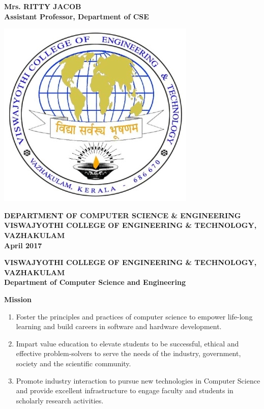 \documentclass[a4 paper,11pt]{report}
\begin{document}
\begin{titlepage}
\begin{center}
		\vspace{0.1cm}
		\large\textbf{Mrs. RITTY JACOB\\ Assistant Professor, Department of CSE}       
        
        \vspace{0.2cm}
        
        \includegraphics[width=.25\textwidth]{vjcet.jpg}
        
        \vspace{0.1cm}
        
        \normalsize \textbf {DEPARTMENT OF COMPUTER SCIENCE \& ENGINEERING}\\
        \vspace{.1cm}
        \large \textbf {VISWAJYOTHI COLLEGE OF ENGINEERING \& TECHNOLOGY, VAZHAKULAM}\\
        \normalsize \textbf{April 2017}
        
    \end{center}
\end{titlepage}

\newpage
\thispagestyle{empty}
\begin{center}
\large \textbf {VISWAJYOTHI COLLEGE OF ENGINEERING \& TECHNOLOGY, VAZHAKULAM}\\
\vspace{.4cm}
\normalsize \textbf{Department of Computer Science and Engineering}
\vspace{.6cm}

\normalsize \textbf{Mission}
\end{center}
\begin{enumerate}

\item Foster the principles and practices of computer science to empower life-long learning and build careers in software and hardware development.

\item Impart value education to elevate students to be successful, ethical and effective problem-solvers to serve the needs of the industry, government, society and the scientific community.
 
\item Promote industry interaction to pursue new technologies in Computer Science and provide excellent infrastructure to engage faculty and students in scholarly research activities.
\end{enumerate}
\end{document}
